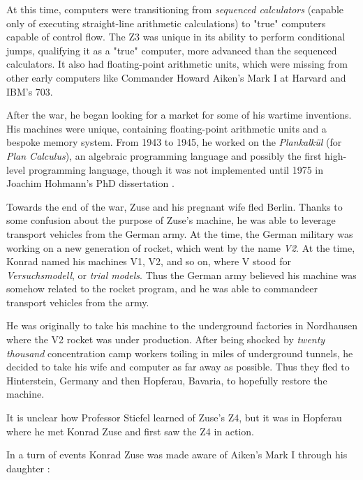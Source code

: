 At this time, computers were transitioning from \textit{sequenced calculators}
(capable only of executing straight-line arithmetic calculations)
to "true" computers capable of control flow.
The Z3 was unique in its ability to perform conditional jumps, qualifying it
as a "true" computer, more advanced than the sequenced calculators.
It also had floating-point arithmetic units, which were missing from other
early computers like Commander Howard Aiken's Mark I at Harvard and IBM's 703.

After the war, he began looking for a market for some of his wartime inventions.
His machines were unique, containing floating-point arithmetic units and a
bespoke memory system.
From 1943 to 1945, he worked on the \textit{Plankalkül} (for \textit{Plan Calculus}),
an algebraic programming language and possibly the first high-level programming language,
though it was not implemented until 1975 in Joachim Hohmann's PhD dissertation
.

Towards the end of the war, Zuse and his pregnant wife fled Berlin.
Thanks to some confusion about the purpose of Zuse's machine, he was able to leverage
transport vehicles from the German army.
At the time, the German military was working on a new generation of rocket, which
went by the name \textit{V2}. At the time, Konrad named his machines V1, V2, and so on,
where V stood for \textit{Versuchsmodell}, or \textit{trial models}.
Thus the German army believed his machine was somehow related to the rocket program,
and he was able to commandeer transport vehicles from the army.

He was originally to take his machine to the underground factories in Nordhausen
where the V2 rocket was under production. After being shocked by \textit{twenty thousand}
concentration camp workers toiling in miles of underground tunnels, he
decided to take his wife and computer as far away as possible.
Thus they fled to Hinterstein, Germany and then Hopferau, Bavaria, to
hopefully restore the machine.

It is unclear how Professor Stiefel learned of Zuse's Z4, but it was in Hopferau
where he met Konrad Zuse and first saw the Z4 in action.

\iffalse
	In a turn of events Konrad Zuse was made
	aware of Aiken's Mark I through his daughter
	\cite{howard_aiken_and_the_dawn_of_the_computer_age_2000}:

